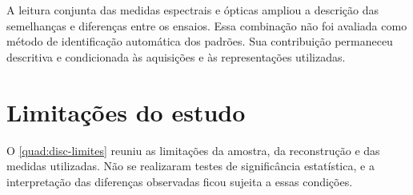 A leitura conjunta das medidas espectrais e ópticas ampliou a descrição
das semelhanças e diferenças entre os ensaios. Essa combinação não foi
avaliada como método de identificação automática dos padrões. Sua contribuição
permaneceu descritiva e condicionada às aquisições e às representações utilizadas.

\FloatBarrier

\section{Limitações do estudo}\label{sec:disc-limitacoes}

O \autoref{quad:disc-limites} reuniu as limitações da amostra, da reconstrução
e das medidas utilizadas. Não se realizaram testes de significância
estatística, e a interpretação das diferenças observadas ficou sujeita
a essas condições.

